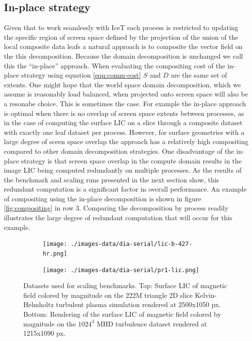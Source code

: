 \documentclass[a4paper,10pt]{article}
\begin{document}
\subsection{In-place strategy}
Given that to work seamlessly with IceT each process is restricted to updating the specific region of screen space defined by the projection of the union of the local composite data leafs a natural approach is to composite the vector field on the this decomposition. Because the domain decomposition is unchanged we call this the ``in-place'' approach. When evaluating the compositing cost of the in-place strategy using equation \ref{eqn:comm-cost} $S$ and $D$ are the same set of extents. One might hope that the world space domain decomposition, which we assume is reasonably load balanced, when projected onto screen space will also be a resonabe choice. This is sometimes the case. For example the in-place approach is optimal when there is no overlap of screen space extents between processes, as in the case of computing the surface LIC on a slice through a composite dataset with exactly one leaf dataset per process. However, for surface geometries with a large degree of sceen space overlap the approach has a relatively high compositing compared to other domain decomposition strategies. One disadvantage of the in-place strategy is that screen space overlap in the compute domain results in the image LIC being computed redundantly on multiple processes. As the results of the benchmark and scaling runs presented in the next section show, this redundant computation is a significant factor in overall performance. An example of compositing using the in-place decomposition is shown in figure \ref{fig:compositing} in row 3. Comparing the decomposition by process readily illustrates the large degree of redundant computation that will occur for this example. 

\begin{figure}[ht]
	\centering
	\begin{subfigure}{\textwidth}
		\centering
		\texttt{[image: ./images-data/dia-serial/lic-b-427-hr.png]}
		\label{fig:scaling-lic}
  \end{subfigure}
	\begin{subfigure}{0.5\textwidth}
		\centering
		\texttt{[image: ./images-data/dia-serial/pr1-lic.png]}
		\label{fig:comp-scaling}  
  \end{subfigure}
\caption{Datasets used for scaling benchmarks. Top: Surface LIC of magnetic field colored by magnitude on the 222M triangle 2D slice Kelvin-Helmholtz turbulent plasma simulation rendered at 2500x1050 px. Bottom: Rendering of the surface LIC of magnetic field colored by magnitude on the $1024^3$ MHD turbulence dataset rendered at 1215x1090 px.}
\end{figure}
\end{document}
